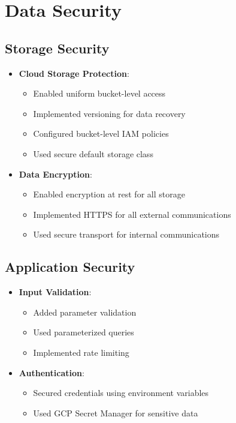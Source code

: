 \documentclass[12pt,a4paper]{report}
\begin{document}
\section{Data Security}

\subsection{Storage Security}
\begin{itemize}
\item \textbf{Cloud Storage Protection}:
    \begin{itemize}
        \item Enabled uniform bucket-level access
        \item Implemented versioning for data recovery
        \item Configured bucket-level IAM policies
        \item Used secure default storage class
    \end{itemize}
\item \textbf{Data Encryption}:
    \begin{itemize}
        \item Enabled encryption at rest for all storage
        \item Implemented HTTPS for all external communications
        \item Used secure transport for internal communications
    \end{itemize}
\end{itemize}

\subsection{Application Security}
\begin{itemize}
\item \textbf{Input Validation}:
    \begin{itemize}
        \item Added parameter validation
        \item Used parameterized queries
        \item Implemented rate limiting
    \end{itemize}
\item \textbf{Authentication}:
    \begin{itemize}
        \item Secured credentials using environment variables
        \item Used GCP Secret Manager for sensitive data
    \end{itemize}
\end{itemize}
\end{document}
